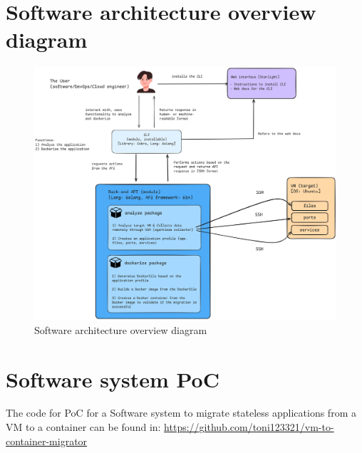 \documentclass{article}
\begin{document}
\newpage
\begin{appendices}

\section{Software architecture overview diagram}
\label{appendix:software-arch-overview-diagram}
\begin{figure}[H]
    \centering
    \includegraphics[width=\linewidth]{images/software-architecture-overview.png}
    \caption{Software architecture overview diagram}
\end{figure}

\section{Software system PoC}
\label{appendix:PoC}
The code for PoC for a Software system to migrate stateless applications from a VM to a container can be found in: \href{https://github.com/toni123321/vm-to-container-migrator}{https://github.com/toni123321/vm-to-container-migrator}
\end{appendices}
\end{document}
